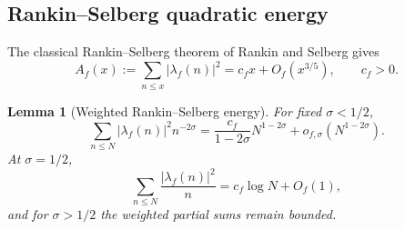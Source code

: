 \documentclass[11pt]{article}
\newtheorem{lemma}[theorem]{Lemma}
\theoremstyle{definition}
\newcommand{\1}{\mathbf 1}
\begin{document}
\subsection{Rankin--Selberg quadratic energy}

The classical Rankin--Selberg theorem of Rankin \cite{Rankin1939} and Selberg \cite{Selberg1940} gives
\begin{equation}\label{eq:rankin-selberg}
A_f(x):=\sum_{n\le x}|\lambda_f(n)|^2
=c_fx+O_f(x^{3/5}),
\qquad c_f>0.
\end{equation}

\begin{lemma}[Weighted Rankin--Selberg energy]\label{lem:modular-energy}
For fixed $\sigma<1/2$,
\begin{equation}\label{eq:weighted-RS-left}
\sum_{n\le N}|\lambda_f(n)|^2n^{-2\sigma}
=
\frac{c_f}{1-2\sigma}N^{1-2\sigma}
+o_{f,\sigma}(N^{1-2\sigma}).
\end{equation}
At $\sigma=1/2$,
\begin{equation}\label{eq:weighted-RS-center}
\sum_{n\le N}\frac{|\lambda_f(n)|^2}{n}
=c_f\log N+O_f(1),
\end{equation}
and for $\sigma>1/2$ the weighted partial sums remain bounded.
\end{lemma}
\end{document}
